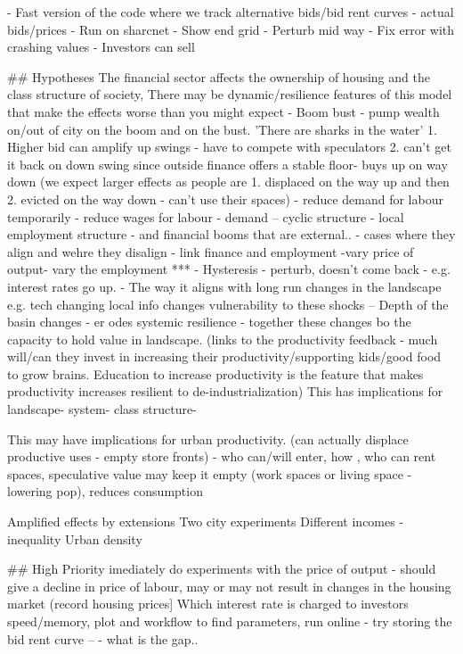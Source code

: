 - Fast version of the code where we track alternative bids/bid rent curves - actual bids/prices
    - Run on sharcnet
    - Show end grid
- Perturb mid way
- Fix error with crashing values
- Investors can sell

## Hypotheses
The financial sector affects the ownership of housing and the class structure of society, 
There may be dynamic/resilience features of this model that make the effects worse than you might expect
- Boom bust - pump wealth on/out of city on the boom and on the bust. 'There are sharks in the water' 1. Higher bid can amplify up swings - have to compete with speculators 2. can't get it back on down swing since outside finance offers a stable floor- buys up on way down (we expect larger effects as people are 1. displaced on the way up and then 2. evicted on the way down - can't use their spaces)
  - reduce demand for labour temporarily - reduce wages for labour - demand -- cyclic structure - local employment structure - and financial booms that are external.. - cases where they align and wehre they disalign
  - link finance and employment -vary price of output- vary the employment *** 
- Hysteresis - perturb, doesn't come back - e.g. interest rates go up.
- The way it aligns with long run changes in the landscape e.g. tech changing local info changes vulnerability to these shocks -- Depth of the basin changes - er   odes systemic resilience - together these changes bo the capacity to hold value in landscape. (links to the productivity feedback - much will/can they invest in increasing their productivity/supporting kids/good food to grow brains. Education to increase productivity is the feature that makes productivity increases resilient to de-industrialization)
This has implications for landscape- system- class structure- 

This may have implications for urban productivity. (can actually displace productive uses - empty store fronts) - who can/will enter, how , who can rent spaces, speculative value may keep it empty (work spaces or living space - lowering pop), reduces consumption


Amplified effects by extensions
Two city experiments
Different incomes  - inequality
Urban density



## High Priority
imediately do experiments with the price of output - should give a decline in price of labour, may or may not result in changes in the housing market (record housing prices]
Which interest rate is charged to investors
speed/memory, plot and workflow to find parameters, run online - try storing the bid rent curve -- - what is the gap.. 

